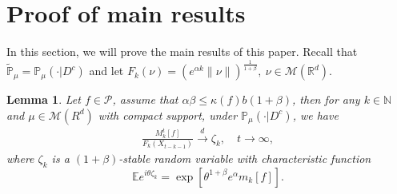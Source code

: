 \documentclass[12pt, a4paper]{amsart}
\newtheorem{lem}[thm]{Lemma}
\theoremstyle{definition}
\numberwithin{equation}{section}
\begin{document}
\section{Proof of main results}

In this section, we will prove the main results of this paper. Recall that $\mathbb{\tilde{P}}_{\mu}=\mathbb{P}_{\mu}(\cdot|D^c)$ and let $F_k(\nu)=\left(e^{\alpha k}\|\nu\|\right)^{\frac{1}{1+\beta}},~ \nu\in \mathcal{M}(\mathbb{R}^d)$.
 \begin{lem}\label{lemma31}
 Let $f\in \mathcal{P}$, assume that $\alpha\beta\leq \kappa(f)b(1+\beta)$, then for any  $k\in\mathbb{N}$ and $\mu \in \mathcal{M}(R^d)$ with compact support, under $\mathbb{P}_{\mu}(\cdot | D ^c)$, we have
 \begin{align}
      \frac{M_k^t[f]}{F_k(X_{t-k-1})}\xrightarrow{d}\zeta_k, \quad t\rightarrow \infty, \label{limitdistribution1}
 \end{align}
 where $\zeta_k$ is a $(1+\beta)$-stable random variable with characteristic function
 $$\mathbb{E}e^{i\theta\zeta_k}=\exp\left[\theta^{1+\beta}e^{\alpha}m_k[f]\right].$$
 \end{lem}
\end{document}
